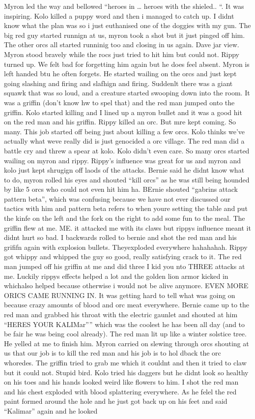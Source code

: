 Myron led the way and bellowed “heroes in … heroes with the shieled.. “. It was inspiring. Kolo killed a puppy word and then i managed to catch up. I didnt know what the plan was so i just euthanised one of the doggies with my gun. The big red guy started runnign at us, myron took a shot but it just pinged off him. The other orcs all started runninig too and closing in us again. Dave jar view. Myron stood bravely while the rocs just tried to hit him but could not. Rippy turned up. We felt bad for forgetting him again but he does feel absent. Myron is left handed btu he often forgets. He started wailing on the orcs and just kept going slashing and firing and slafhign and firing. Suddenlt there was a giant squawk that was so loud, and a creature started swooping down into the room. It was a griffin (don’t know hw to spel that) and the red man jumped onto the griffin. Kolo started killing and I lined up a myron bullet and it was a good hit on the red man and his griffin. Rippy killed an orc. But mre kept coming. So many. This job started off being just about killing a few orcs. Kolo thinks we’ve actually what weve really did is just genocided a orc village. The red man did a battle cry and threw a spear at kolo. Kolo didn’t even care. So many orcs started wailing on myron and rippy. Rippy’s influence was great for us and myron and kolo just kept shrugign off laods of the attacks. Bernie said he didnt know what to do, myron rolled his eyes and shouted “kill orcs” as he was still being hounded by like 5 orcs who could not even hit him ha. BErnie shouted “gabrins attack pattern beta”, which was confusing because we have not ever discussed our tactics with him and pattern beta refers to when youre setting the table and put the kinfe on the left and the fork on the right to add some fun to the meal. The griffin flew at me. ME. it attacked me with its claws but rippys influence meant it didnt hurt so bad. I backwards rolled to bernie and shot the red man and his grififn again with explosion bullets. Theyexploded everywhere hahahahah. Rippy got whippy and whipped the guy so good, really satisfying crack to it. The red man jumped off his griffin at me and did three I kid you nto THREE attacks at me. Luckily rippys effects helped a lot and the golden lion armor kicked in whichalso helped because otherwise i would not be alive anymore. EVEN MORE ORICS CAME RUNNING IN. It was getting hard to tell what was going on because crazy amounts of blood and orc meat everywhere. Bernie came up to the red man and grabbed his throat with the electric gaunlet and shouted at him “HERES YOUR KALIMar”” which was the coolest he has been all day (and to be fair he was being cool already). The red man lit up like a winter solstice tree. He yelled at me to finish him. Myron carried on slewing through orcs shouting at us that our job is to kill the red man and his job is to hol dback the orc whoredes. The griffin tried to grab me which it couldnt and then it tried to claw but it could not. Stupid bird. Kolo tried his daggers but he didnt look so healthy on his toes and his hands looked weird like flowers to him. I shot the red man and his chest exploded with blood splattering everywhere. As he felel the red paint formed around the hole and he just got back up on his feet and said “Kalimar” again and he looked 